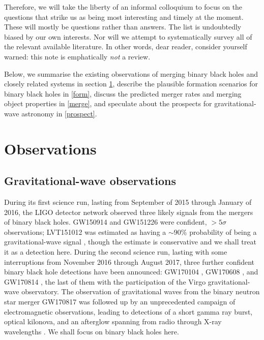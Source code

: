 \documentclass[iop,onecolumn]{revtex4}
\begin{document}
Therefore, we will take the liberty of an informal colloquium to focus on the questions that strike us as being most interesting and timely at the moment.  These will mostly be questions rather than answers.  The list is undoubtedly biased by our own interests.  Nor will we attempt to systematically survey all of the relevant available literature.  In other words, dear reader, consider yourself warned: this note is emphatically {\it not} a review.

Below, we summarise the existing observations of merging binary black holes and closely related systems in section \ref{obs}, describe the plausible formation scenarios for binary black holes in \autoref{form}, discuss the predicted merger rates and merging object properties in \autoref{merge}, and speculate about the prospects for gravitational-wave astronomy in \autoref{prospect}.


 

\section{Observations}\label{obs}

\subsection{Gravitational-wave observations}

During its first science run, lasting from September of 2015 through January of 2016, the LIGO detector network observed three likely signals from the mergers of binary black holes.  GW150914 \citep{GW150914} and GW151226 \citep{GW151226} were confident, $> 5\sigma$ observations; LVT151012 was estimated as having a $\sim 90\%$ probability of being a gravitational-wave signal \citep{GW150914:rates,BBH:O1}, though the estimate is conservative and we shall treat it as a detection here.  During the second science run, lasting with some interruptions from November 2016 through August 2017, three further confident binary black hole detections have been announced: GW170104 \citep{GW170104},  GW170608 \citep{GW170608}, and GW170814 \citep{GW170814}, the last of them with the participation of the Virgo gravitational-wave observatory.   The observation of gravitational waves from the binary neutron star merger GW170817 \citep{GW170817} was followed up by an unprecedented campaign of electromagnetic observations, leading to detections of a short gamma ray burst, optical kilonova, and an afterglow spanning from radio through X-ray wavelengths \citep{GW170817GRB,GW170817MMA}.  We shall focus on binary black holes here.
\end{document}

